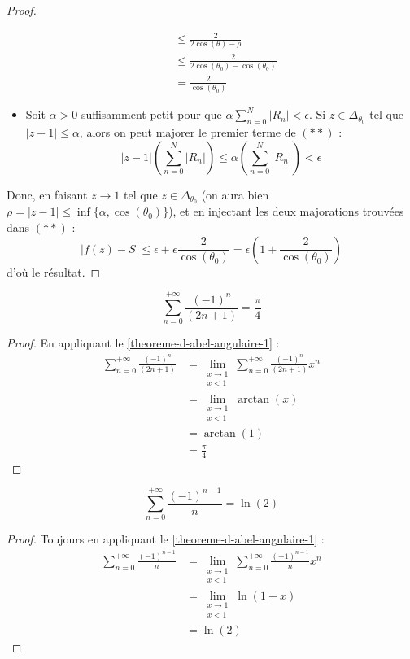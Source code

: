 \begin{proof}
\begin{itemize}
\begin{align*}
        &\leq \frac{2}{2\cos(\theta) - \rho} \\
        &\leq \frac{2}{2\cos(\theta_0) - \cos(\theta_0)} \\
        &= \frac{2}{\cos(\theta_0)}
      \end{align*}
      \item Soit $\alpha > 0$ suffisamment petit pour que $\alpha \sum_{n=0}^N |R_n| < \epsilon$. Si $z \in \Delta_{\theta_0}$ tel que $|z-1| \leq \alpha$, alors on peut majorer le premier terme de $(**)$ :
      \[ |z-1| \left( \sum_{n=0}^N |R_n| \right) \leq \alpha \left( \sum_{n=0}^N |R_n| \right) < \epsilon \]
    \end{itemize}
    Donc, en faisant $z \longrightarrow 1$ tel que $z \in \Delta_{\theta_0}$ (on aura bien $\rho = |z-1| \leq \inf \{ \alpha, \cos(\theta_0) \}$), et en injectant les deux majorations trouvées dans $(**)$ :
    \[ |f(z)-S| \leq \epsilon + \epsilon \frac{2}{\cos(\theta_0)} = \epsilon \left(1 + \frac{2}{\cos(\theta_0)} \right) \]
    d'où le résultat.
  \end{proof}

  \begin{application}
    \[ \sum_{n=0}^{+\infty} \frac{(-1)^n}{(2n+1)} = \frac{\pi}{4} \]
  \end{application}

  \begin{proof}
    En appliquant le \cref{theoreme-d-abel-angulaire-1} :
    \begin{align*}
      \sum_{n=0}^{+\infty} \frac{(-1)^n}{(2n+1)} &= \lim_{\substack{x \rightarrow 1 \\ x < 1}} \sum_{n=0}^{+\infty} \frac{(-1)^n}{(2n+1)} x^n \\
      &= \lim_{\substack{x \rightarrow 1 \\ x < 1}} \arctan(x) \\
      &= \arctan(1) \\
      &= \frac{\pi}{4}
    \end{align*}
  \end{proof}

  \begin{application}
    \[ \sum_{n=0}^{+\infty} \frac{(-1)^{n-1}}{n} = \ln(2) \]
  \end{application}

  \begin{proof}
    Toujours en appliquant le \cref{theoreme-d-abel-angulaire-1} :
    \begin{align*}
      \sum_{n=0}^{+\infty} \frac{(-1)^{n-1}}{n} &= \lim_{\substack{x \rightarrow 1 \\ x < 1}} \sum_{n=0}^{+\infty} \frac{(-1)^{n-1}}{n} x^n \\
      &= \lim_{\substack{x \rightarrow 1 \\ x < 1}} \ln(1 + x) \\
      &= \ln(2)
    \end{align*}
  \end{proof}

